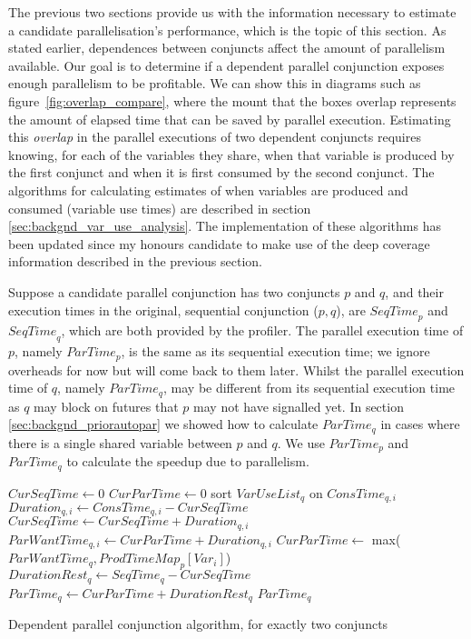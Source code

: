 
The previous two sections provide us with the information necessary to
estimate a candidate parallelisation's performance,
which is the topic of this section.
As stated earlier,
dependences between conjuncts affect the amount of parallelism
available.
Our goal is to determine if a dependent parallel conjunction exposes enough
parallelism to be profitable.
We can show this in
diagrams such as
figure~\ref{fig:overlap_compare},
where the mount that the boxes overlap represents the amount of elapsed time
that can be saved by parallel execution.
Estimating this \emph{overlap}
in the parallel executions of two dependent conjuncts
requires knowing, for each of the variables they share,
when that variable is produced by the first conjunct and
when it is first consumed by the second conjunct.
The algorithms for calculating estimates of when variables are produced and
consumed
(variable use times)
are described in section \ref{sec:backgnd_var_use_analysis}.
The implementation of these algorithms has been updated since my honours
candidate to make use of the deep coverage information described in the
previous section.

Suppose a candidate parallel conjunction has two conjuncts $p$ and $q$,
and their execution times in the original, sequential conjunction ($p, q$),
are ${SeqTime}_p$ and ${SeqTime}_q$, which are both provided by the profiler.
The parallel execution time of $p$, namely $ParTime_p$,
is the same as its sequential execution time;
we ignore overheads for now but will come back to them later.
Whilst the parallel execution time of $q$, namely $ParTime_q$, may be
different from its sequential execution time as $q$ may block on futures
that $p$ may not have signalled yet.
In section \ref{sec:backgnd_priorautopar} we showed how to calculate
$ParTime_q$ in cases where there is a single shared variable between $p$ and
$q$.
We use $ParTime_p$ and $ParTime_q$ to calculate the speedup due to
parallelism.

\begin{algorithm}
\begin{algorithmic}[5]
\State $CurSeqTime \gets 0$
\State $CurParTime \gets 0$
\State sort $VarUseList_q$ on $ConsTime_{q, i}$
    \State $Duration_{q, i} \gets ConsTime_{q, i} - CurSeqTime$
    \State $CurSeqTime \gets CurSeqTime + Duration_{q, i}$
    \State $ParWantTime_{q, i} \gets CurParTime + Duration_{q, i}$
    \State $CurParTime \gets$ max($ParWantTime_q, ProdTimeMap_{p}[Var_i]$)
\EndFor
\State $DurationRest_q \gets SeqTime_q - CurSeqTime$
\State $ParTime_q \gets CurParTime + DurationRest_q$
\State \Return $ParTime_q$
\EndProcedure
\end{algorithmic}
\caption{Dependent parallel conjunction algorithm, for exactly two conjuncts}
\label{alg:dep_par_conj_overlap_simple}
\end{algorithm}

